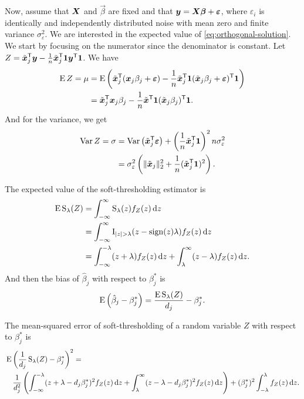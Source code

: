 Now, assume that \(\boldsymbol{X}\) and \(\vec{\beta}\) are fixed and that \(\boldsymbol{y} = \boldsymbol{X}\boldsymbol{\beta} + \boldsymbol{\varepsilon}\), where \(\varepsilon_i\) is identically and independently distributed noise with mean zero and finite variance \(\sigma_\varepsilon^2\). We are interested in the expected value of \eqref{eq:orthogonal-solution}. We start by focusing on the numerator since the denominator is constant. Let \(Z = \tilde{\boldsymbol{x}}_j^{\mathsf{T}} \boldsymbol{y} - \frac{1}{n} \tilde{\boldsymbol{x}}_j^{\mathsf{T}} \boldsymbol{1} \boldsymbol{y}^{\mathsf{T}} \boldsymbol{1}\). We have
\[
  \begin{aligned}
    \operatorname{E} Z = \mu & = \operatorname{E} \left( \tilde{\boldsymbol{x}}_j^{\mathsf{T}} (\boldsymbol{x}_j\beta_j + \boldsymbol{\varepsilon}) - \frac{1}{n} \tilde{\boldsymbol{x}}_j^{\mathsf{T}} \boldsymbol{1} (\tilde{\boldsymbol{x}}_j\beta_j + \boldsymbol{\varepsilon})^{\mathsf{T}} \boldsymbol{1} \right) \\
               & = \tilde{\boldsymbol{x}}_j^{\mathsf{T}}\boldsymbol{x}_j \beta_j - \frac{1}{n} \tilde{\boldsymbol{x}}^{\mathsf{T}} \boldsymbol{1} (\tilde{\boldsymbol{x}}_j\beta_j)^{\mathsf{T}}\boldsymbol{1}.
  \end{aligned}
\]
And for the variance, we get
\[
  \begin{aligned}
    \operatorname{Var} Z = \sigma & = \operatorname{Var}\left(\tilde{\boldsymbol{x}}_j ^{\mathsf{T}} \boldsymbol{\varepsilon}\right) + \left(\frac{1}{n}\tilde{\boldsymbol{x}}_j^{\mathsf{T}} \boldsymbol{1}\right)^2 n \sigma_\varepsilon^2 \\
                    & = \sigma_\varepsilon^2\left( \lVert \tilde{\boldsymbol{x}}_j\rVert_2^2 +\frac{1}{n}(\tilde{\boldsymbol{x}}_j^{\mathsf{T}} \boldsymbol{1})^2\right).
  \end{aligned}
\]

The expected value of the soft-thresholding estimator is
\[
  \begin{aligned}
    \operatorname{E} \operatorname{S}_\lambda(Z) & = \int_{-\infty}^\infty \operatorname{S}_\lambda(z) f_Z(z) \mathop{}\!\mathrm{d} z                                                     \\
                      & = \int_{-\infty}^\infty \operatorname{I}_{|z| > \lambda} (z -\operatorname{sign}(z)\lambda) f_Z(z) \mathop{}\!\mathrm{d} z                           \\
                      & = \int_{-\infty}^{-\lambda}(z + \lambda)f_Z(z) \mathop{}\!\mathrm{d} z + \int_{\lambda}^\infty (z - \lambda)f_Z(z) \mathop{}\!\mathrm{d} z.
  \end{aligned}
\]
And then the bias of \(\hat\beta_j\) with respect to \(\beta_j^*\) is
\begin{equation}
  \label{eq:bias}
  \operatorname{E} \left( \hat\beta_j - \beta_j^* \right) = \frac{\operatorname{E} \operatorname{S}_\lambda(Z)}{d_j} - \beta^*_j.
\end{equation}

The mean-squared error of soft-thresholding of a random variable \(Z\) with respect to \(\beta^*_j\) is
\[
  \begin{multlined}
    \E\left( \frac{1}{d_j}\st_\lambda(Z) - \beta^*_j\right)^2  = \\
    \frac{1}{d_j^2}\left(\int_{-\infty}^{-\lambda}(z + \lambda - d_j\beta_j^*)^2 f_Z(z)\du z + \int_{\lambda}^{\infty}(z - \lambda - d_j\beta_j^*)^2 f_Z(z)\du z\right) +( \beta_j^*)^2 \int_{-\lambda}^\lambda f_Z(z) \du z.
  \end{multlined}
\]

